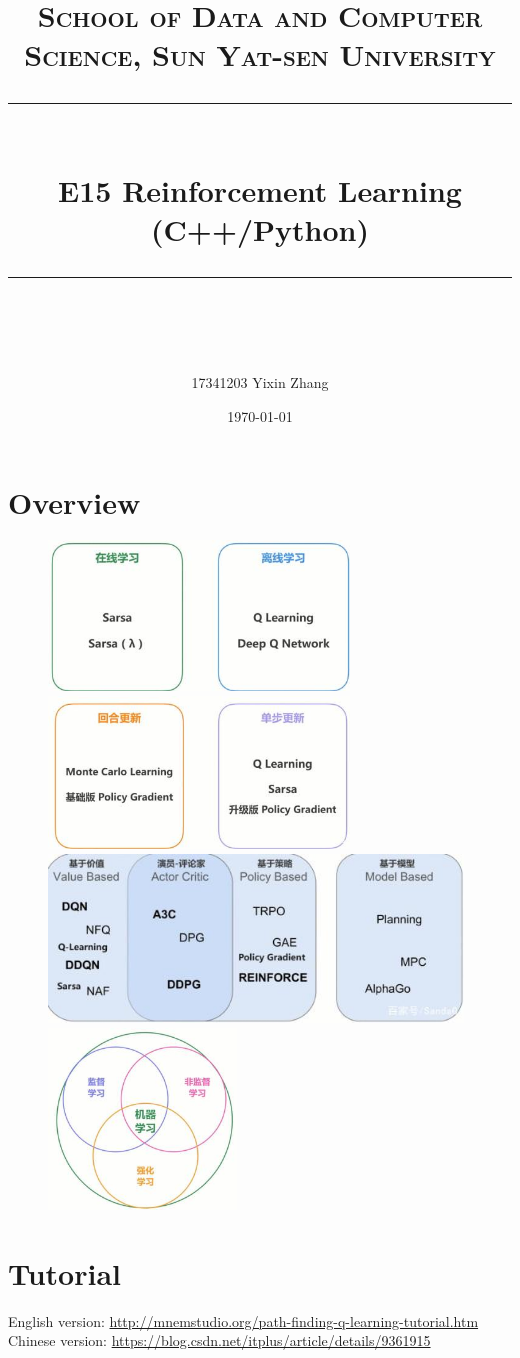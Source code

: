\documentclass[a4paper, 11pt]{article}
\title{	
\normalfont \normalsize
\textsc{School of Data and Computer Science, Sun Yat-sen University} \\ [25pt] %
\rule{\textwidth}{0.5pt} \\[0.4cm] %
\huge  E15 Reinforcement Learning (C++/Python)\\ %
\rule{\textwidth}{2pt} \\[0.5cm] %
\author{17341203 Yixin Zhang}
\date{\normalsize\today}
}
\begin{document}
\maketitle
\tableofcontents
\newpage
\section{Overview}
\begin{figure}[ht]
\centering
\includegraphics[width=8cm]{Pic/on_off}
\quad
\includegraphics[width=8cm]{Pic/update}
\includegraphics[width=11cm]{Pic/base}
\quad
\includegraphics[width=5cm]{Pic/relation}
\end{figure}
\section{Tutorial}
English version: \url{http://mnemstudio.org/path-finding-q-learning-tutorial.htm}\\
Chinese version: \url{https://blog.csdn.net/itplus/article/details/9361915}
\end{document}
